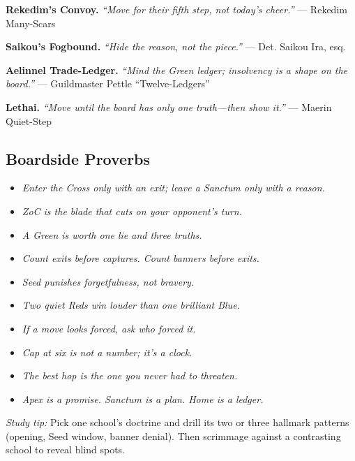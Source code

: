 \documentclass[11pt]{article}
\begin{document}
\noindent\textbf{Rekedim’s Convoy.} \textit{“Move for their fifth step, not today’s cheer.”} — Rekedim Many-Scars

\noindent\textbf{Saikou’s Fogbound.} \textit{“Hide the reason, not the piece.”} — Det. Saikou Ira, esq.

\noindent\textbf{Aelinnel Trade-Ledger.} \textit{“Mind the Green ledger; insolvency is a shape on the board.”} — Guildmaster Pettle “Twelve-Ledgers”

\noindent\textbf{Lethai.} \textit{“Move until the board has only one truth---then show it.”} — Maerin Quiet-Step

\vspace{0.75em}

\subsection*{Boardside Proverbs}
\begin{itemize}\itemsep0.25em
  \item \textit{Enter the Cross only with an exit; leave a Sanctum only with a reason.}
  \item \textit{ZoC is the blade that cuts on your opponent’s turn.}
  \item \textit{A Green is worth one lie and three truths.}
  \item \textit{Count exits before captures. Count banners before exits.}
  \item \textit{Seed punishes forgetfulness, not bravery.}
  \item \textit{Two quiet Reds win louder than one brilliant Blue.}
  \item \textit{If a move looks forced, ask who forced it.}
  \item \textit{Cap at six is not a number; it’s a clock.}
  \item \textit{The best hop is the one you never had to threaten.}
  \item \textit{Apex is a promise. Sanctum is a plan. Home is a ledger.}
\end{itemize}

\bigskip

\noindent\emph{Study tip:} Pick one school’s doctrine and drill its two or three hallmark patterns (opening, Seed window, banner denial). Then scrimmage against a contrasting school to reveal blind spots.
\end{document}
